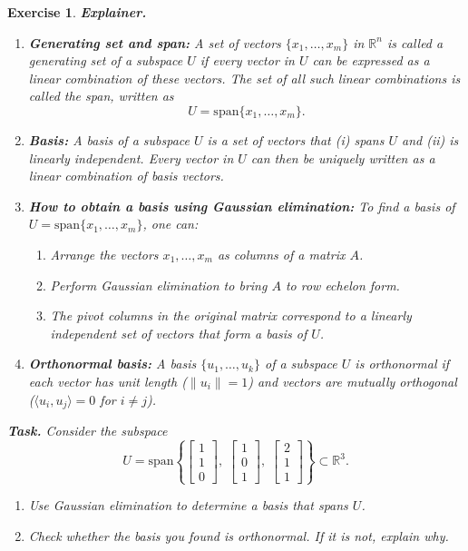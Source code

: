 \documentclass[12pt,a4paper]{article}
\newtheorem{exercise}{Exercise}[section]
\begin{document}
\begin{exercise}
\textbf{Explainer.}

\begin{enumerate}
  \item \textbf{Generating set and span:}  
  A set of vectors $\{x_1, \ldots, x_m\}$ in $\mathbb{R}^n$ is called a \emph{generating set} of a subspace $U$ if every vector in $U$ can be expressed as a linear combination of these vectors. The set of all such linear combinations is called the \emph{span}, written as
  \[
  U = \mathrm{span}\{x_1, \ldots, x_m\}.
  \]

  \item \textbf{Basis:}  
  A basis of a subspace $U$ is a set of vectors that (i) spans $U$ and (ii) is linearly independent. Every vector in $U$ can then be uniquely written as a linear combination of basis vectors.

  \item \textbf{How to obtain a basis using Gaussian elimination:}  
  To find a basis of $U = \mathrm{span}\{x_1, \ldots, x_m\}$, one can:
  \begin{enumerate}[label=(\roman*)]
    \item Arrange the vectors $x_1, \ldots, x_m$ as columns of a matrix $A$.  
    \item Perform Gaussian elimination to bring $A$ to row echelon form.  
    \item The pivot columns in the original matrix correspond to a linearly independent set of vectors that form a basis of $U$.  
  \end{enumerate}

  \item \textbf{Orthonormal basis:}  
  A basis $\{u_1, \ldots, u_k\}$ of a subspace $U$ is \emph{orthonormal} if each vector has unit length ($\|u_i\| = 1$) and vectors are mutually orthogonal ($\langle u_i, u_j \rangle = 0$ for $i \neq j$).  
\end{enumerate}

\bigskip

\textbf{Task.}  
Consider the subspace
\[
U = \mathrm{span}\left\{ 
\begin{bmatrix}1 \\ 1 \\ 0\end{bmatrix}, \;
\begin{bmatrix}1 \\ 0 \\ 1\end{bmatrix}, \;
\begin{bmatrix}2 \\ 1 \\ 1\end{bmatrix}
\right\} \subset \mathbb{R}^3.
\]
\begin{enumerate}[label=(\alph*)]
    \item Use Gaussian elimination to determine a basis that spans $U$.  
    \item Check whether the basis you found is orthonormal. If it is not, explain why.  
\end{enumerate}
\end{exercise}
\end{document}

